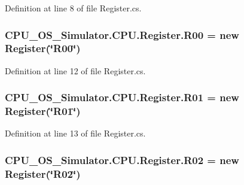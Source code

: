 Definition at line 8 of file Register.\+cs.

\hypertarget{class_c_p_u___o_s___simulator_1_1_c_p_u_1_1_register_a14dd660fd5c709aa90298e0716d8b88a}{}
\subsubsection[{R00}]{ C\+P\+U\+\_\+\+O\+S\+\_\+\+Simulator.\+C\+P\+U.\+Register.\+R00 = new {\bf Register}(\char`\"{}R00\char`\"{})\hspace{0.3cm}{\ttfamily [static]}}\label{class_c_p_u___o_s___simulator_1_1_c_p_u_1_1_register_a14dd660fd5c709aa90298e0716d8b88a}


Definition at line 12 of file Register.\+cs.

\hypertarget{class_c_p_u___o_s___simulator_1_1_c_p_u_1_1_register_a8e2da18c4d80597ebe22c0cdd23d5211}{}
\subsubsection[{R01}]{ C\+P\+U\+\_\+\+O\+S\+\_\+\+Simulator.\+C\+P\+U.\+Register.\+R01 = new {\bf Register}(\char`\"{}R01\char`\"{})\hspace{0.3cm}{\ttfamily [static]}}\label{class_c_p_u___o_s___simulator_1_1_c_p_u_1_1_register_a8e2da18c4d80597ebe22c0cdd23d5211}


Definition at line 13 of file Register.\+cs.

\hypertarget{class_c_p_u___o_s___simulator_1_1_c_p_u_1_1_register_a80b13ce612c017c483a1a4edfecd6d99}{}
\subsubsection[{R02}]{ C\+P\+U\+\_\+\+O\+S\+\_\+\+Simulator.\+C\+P\+U.\+Register.\+R02 = new {\bf Register}(\char`\"{}R02\char`\"{})\hspace{0.3cm}{\ttfamily [static]}}\label{class_c_p_u___o_s___simulator_1_1_c_p_u_1_1_register_a80b13ce612c017c483a1a4edfecd6d99}



